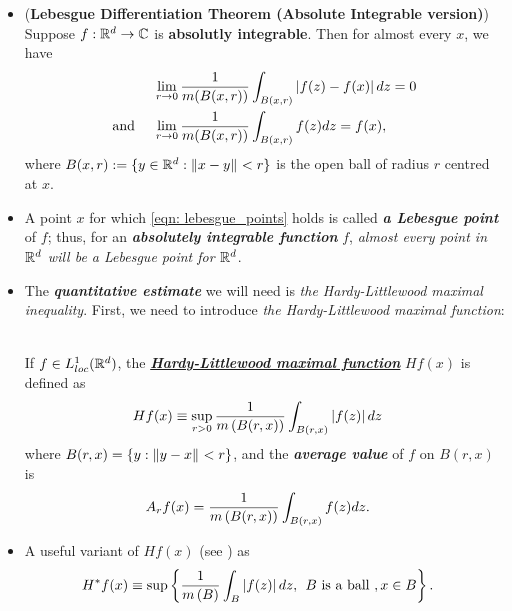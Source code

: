 \documentclass[11pt]{article}
\begin{document}
\begin{itemize}
\item \begin{theorem}(\textbf{Lebesgue Differentiation Theorem  (Absolute Integrable version)}) \citep{tao2011introduction}\\
Suppose $f: {\mathbb R}^{d} \rightarrow {\mathbb C}$ is \textbf{absolutly integrable}. Then for almost every $x$, we have 
\begin{align}
&\lim\limits_{r\rightarrow 0}\frac{1}{m(B(x, r))}\int_{B(x, r)}\left\lvert f(z) - f(x) \right\rvert dz = 0 \label{eqn: lebesgue_points}\\
\text{and }\quad & \lim\limits_{r\rightarrow 0}\frac{1}{m(B(x, r))}\int_{B(x, r)}f(z) dz = f(x), \nonumber
\end{align}
where $B(x, r) := \{ y \in {\mathbb R}^d : \left\|x - y\right\|_{} < r\}$ is the open ball of radius $r$ centred at $x$.
\end{theorem}

\item \begin{definition}
A point $x$ for which \eqref{eqn: lebesgue_points} holds is called \emph{\textbf{a Lebesgue point}} of $f$; thus, for an \textbf{\emph{absolutely integrable function}} $f$, \emph{almost every point in ${\mathbb R}^d$ will be a Lebesgue point for ${\mathbb R}^d$}.
\end{definition}


\item The \emph{\textbf{quantitative estimate}} we will need is \emph{the Hardy-Littlewood maximal inequality}. First, we need to introduce \emph{the Hardy-Littlewood maximal function}: 
\begin{definition}\citep{folland2013real}\\
If $f\in L_{loc}^{1}({\mathbb R}^{d})$, the \underline{\emph{\textbf{Hardy-Littlewood maximal function}}} $Hf(x)$ is defined as
\begin{align*}
Hf(x)&\equiv \sup_{r>0}\frac{1}{m\left(B(r,x)\right)}\int_{B(r,x)}\left\lvert f(z) \right\rvert dz
\end{align*}
where $B(r,x)= \left\{y: \left\|y-x\right\|_{}< r\right\}$, and the \emph{\textbf{average value}} of $f$ on $B(r,x)$ is 
\begin{align*}
A_{r}f(x)&=\frac{1}{m\left(B(r,x)\right)}\int_{B(r,x)}f(z)dz.
\end{align*}
\end{definition}

\item \begin{remark}
 A useful variant of $Hf(x)$ (see \citep{stein2009real}) as 
\begin{align*}
H^{*}f(x) &\equiv \sup\left\{ \frac{1}{m\left(B\right)}\int_{B}\left\lvert f(z) \right\rvert dz, \;\, B\text{ is a ball }, x\in B  \right\}.
\end{align*}
\end{remark}


\end{itemize}
\end{document}
